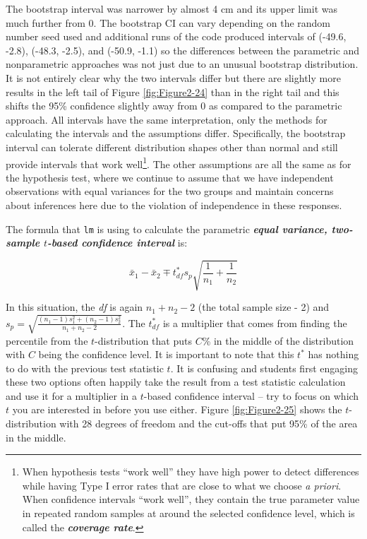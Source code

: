 \documentclass[
]{book}
\begin{document}
The bootstrap interval was narrower by almost 4 cm and its upper limit was much further from 0. The bootstrap CI can vary depending on the random number seed used and additional runs of the code produced intervals of (-49.6, -2.8), (-48.3, -2.5), and (-50.9, -1.1) so the differences between the parametric and nonparametric approaches was not just due to an unusual bootstrap distribution. It is not entirely clear why the two intervals differ but there are slightly more results in the left tail of Figure \ref{fig:Figure2-24} than in the right tail and this shifts the 95\% confidence slightly away from 0 as compared to the parametric approach. All intervals have the same interpretation, only the methods for calculating the
intervals and the assumptions differ. Specifically, the bootstrap interval can
tolerate different distribution shapes other than normal and still provide
intervals that work well\footnote{When hypothesis tests ``work well'' they have high
  power  to detect differences while having Type I error rates  that are close
  to what we choose \emph{a priori}. When confidence intervals ``work well'', they contain
  the true parameter value in repeated random samples at around the selected
  confidence level, which is called the \textbf{\emph{coverage rate}}. }. The other assumptions
are all the same as for the hypothesis
test, where we continue to assume that we have independent observations with
equal variances for the two groups and maintain concerns about inferences here due to the violation of independence in these responses.

\indent The formula that \texttt{lm} is using to calculate the parametric
\textbf{\emph{equal variance, two-sample \(t\)-based confidence interval}} is:

\[\bar{x}_1 - \bar{x}_2 \mp t^*_{df}s_p\sqrt{\frac{1}{n_1}+\frac{1}{n_2}}\]

In this situation, the \emph{df} is again \(n_1+n_2-2\) (the total sample size - 2) and
\(s_p = \sqrt{\frac{(n_1-1)s_1^2 + (n_2-1)s_2^2}{n_1+n_2-2}}\). The \(t^*_{df}\) is
a multiplier that comes from finding the percentile from the \(t\)-distribution
that puts \(C\)\% in the middle of the distribution with \(C\) being the confidence
level. It is important to note that this \(t^*\) has nothing to do with the previous
test statistic \(t\). It is confusing and students first engaging these two options often happily
take the result from a test statistic calculation and use it for a multiplier
in a \(t\)-based confidence interval -- try to focus on which \(t\) you are interested in before you use either. Figure \ref{fig:Figure2-25} shows the
\(t\)-distribution with 28 degrees of freedom and the cut-offs that put 95\% of the
area in the middle.
\end{document}
